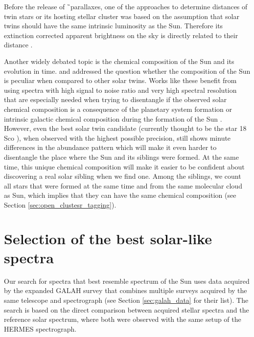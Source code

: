 Before the release of \G\ parallaxes, one of the approaches to determine distances of twin stars or its hosting stellar cluster was based on the assumption that solar twins should have the same intrinsic luminosity as the Sun. Therefore its extinction corrected apparent brightness on the sky is directly related to their distance \cite{2015MNRAS.453.1428J, 2016A&A...595A..59M, 2017MNRAS.472.2517J}.

Another widely debated topic is the chemical composition of the Sun and its evolution in time. \citet{2009A&A...508L..17R} and \citet{2015A&A...579A..52N} addressed the question whether the composition of the Sun is peculiar when compared to other solar twins. Works like these benefit from using spectra with high signal to noise ratio and very high spectral resolution that are especially needed when trying to disentangle if the observed solar chemical composition is a consequence of the planetary system formation \cite{2014A&A...572A..48R} or intrinsic galactic chemical composition during the formation of the Sun \cite{2015A&A...579A..52N, 2016A&A...593A..65N, 2020A&A...633L...9J}. However, even the best solar twin candidate (currently thought to be the star 18 Sco \cite{2014ApJ...791...14M}), when observed with the highest possible precision, still shows minute differences in the abundance pattern which will make it even harder to disentangle the place where the Sun and its siblings were formed. At the same time, this unique chemical composition will make it easier to be confident about discovering a real solar sibling when we find one. Among the siblings, we count all stars that were formed at the same time and from the same molecular cloud as Sun, which implies that they can have the same chemical composition (see Section \ref{sec:open_clustesr_tagging}).


\section{Selection of the best solar-like spectra}
\label{sec:05_selection}
Our search for spectra that best resemble spectrum of the Sun uses data acquired by the expanded GALAH survey that combines multiple surveys acquired by the same telescope and spectrograph (see Section \ref{sec:galah_data} for their list). The search is based on the direct comparison between acquired stellar spectra and the reference solar spectrum, where both were observed with the same setup of the HERMES spectrograph.

